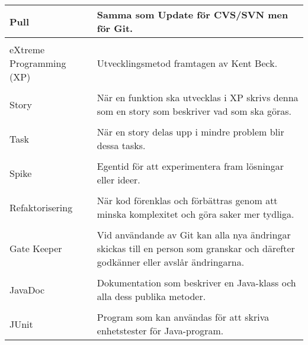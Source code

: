 \begin{table}
\begin{tabular}{ | l |  p{7cm} |}
\\Pull	 & Samma som Update för CVS/SVN men för Git. \\ \hline
\\eXtreme Programming (XP) &	Utvecklingsmetod framtagen av Kent Beck. \\ \hline
\\Story &	När en funktion ska utvecklas i XP skrivs denna som en story som beskriver vad som ska göras. \\ \hline
\\Task	& När en story delas upp i mindre problem blir dessa tasks. \\ \hline
\\Spike &	Egentid för att experimentera fram lösningar eller ideer. \\ \hline
\\Refaktorisering &	När kod förenklas och förbättras genom att minska komplexitet och göra saker mer tydliga. \\ \hline
\\Gate Keeper &	Vid användande av Git kan alla nya ändringar skickas till en person som granskar och därefter godkänner eller avslår ändringarna.  \\ \hline
\\JavaDoc &	Dokumentation som beskriver en Java-klass och alla dess publika metoder. \\ \hline
\\JUnit	& Program som kan användas för att skriva enhetstester för Java-program. \\ \hline

\end{tabular}
\end{table}
